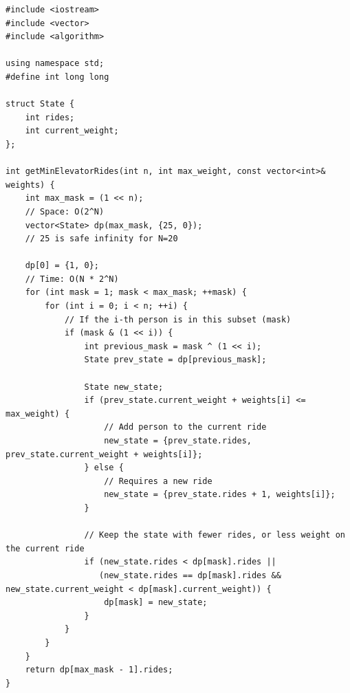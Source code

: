 \begin{lstlisting}
#include <iostream>
#include <vector>
#include <algorithm>

using namespace std;
#define int long long

struct State {
    int rides;
    int current_weight;
};

int getMinElevatorRides(int n, int max_weight, const vector<int>& weights) {
    int max_mask = (1 << n);
    // Space: O(2^N)
    vector<State> dp(max_mask, {25, 0});
    // 25 is safe infinity for N=20
    
    dp[0] = {1, 0};
    // Time: O(N * 2^N)
    for (int mask = 1; mask < max_mask; ++mask) {
        for (int i = 0; i < n; ++i) {
            // If the i-th person is in this subset (mask)
            if (mask & (1 << i)) {
                int previous_mask = mask ^ (1 << i);
                State prev_state = dp[previous_mask];
                
                State new_state;
                if (prev_state.current_weight + weights[i] <= max_weight) {
                    // Add person to the current ride
                    new_state = {prev_state.rides, prev_state.current_weight + weights[i]};
                } else {
                    // Requires a new ride
                    new_state = {prev_state.rides + 1, weights[i]};
                }
                
                // Keep the state with fewer rides, or less weight on the current ride
                if (new_state.rides < dp[mask].rides || 
                   (new_state.rides == dp[mask].rides && new_state.current_weight < dp[mask].current_weight)) {
                    dp[mask] = new_state;
                }
            }
        }
    }
    return dp[max_mask - 1].rides;
}
\end{lstlisting}
